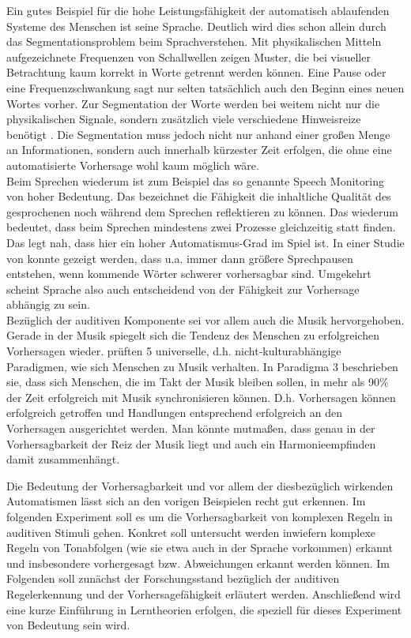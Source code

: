 \documentclass[doc,a4paper,12pt]{apa6}
\begin{document}
Ein gutes Beispiel für die hohe Leistungsfähigkeit der automatisch ablaufenden Systeme des Menschen ist seine Sprache. Deutlich wird dies schon allein durch das Segmentationsproblem beim Sprachverstehen. Mit physikalischen Mitteln aufgezeichnete Frequenzen von Schallwellen zeigen Muster, die bei visueller Betrachtung kaum korrekt in Worte getrennt werden können. Eine Pause oder eine Frequenzschwankung sagt nur selten tatsächlich auch den Beginn eines neuen Wortes vorher. Zur Segmentation der Worte werden bei weitem nicht nur die physikalischen Signale, sondern zusätzlich viele verschiedene Hinweisreize benötigt \parencites[u.a.][]{brent1996distributional}{saffran1996word}. Die Segmentation muss jedoch nicht nur anhand einer großen Menge an Informationen, sondern auch innerhalb kürzester Zeit erfolgen, die ohne eine automatisierte Vorhersage wohl kaum möglich wäre.\\
Beim Sprechen wiederum ist zum Beispiel das so genannte Speech Monitoring \parencites{levelt1983monitoring}{postma2000detection} von hoher Bedeutung. Das bezeichnet die Fähigkeit die inhaltliche Qualität des gesprochenen noch während dem Sprechen reflektieren zu können. Das wiederum bedeutet, dass beim Sprechen mindestens zwei Prozesse gleichzeitig statt finden. Das legt nah, dass hier ein hoher Automatismus-Grad im Spiel ist. In einer Studie von \textcite{goldman1958speech} konnte gezeigt werden, dass u.a. immer dann größere Sprechpausen entstehen, wenn kommende Wörter schwerer vorhersagbar sind. Umgekehrt scheint Sprache also auch entscheidend von der Fähigkeit zur Vorhersage abhängig zu sein.\\
Bezüglich der auditiven Komponente sei vor allem auch die Musik hervorgehoben. Gerade in der Musik spiegelt sich die Tendenz des Menschen zu erfolgreichen Vorhersagen wieder. \textcite{drake2001quest} prüften 5 universelle, d.h. nicht-kulturabhängige Paradigmen, wie sich Menschen zu Musik verhalten. In Paradigma 3 beschrieben sie, dass sich Menschen, die im Takt der Musik bleiben sollen, in mehr als 90\% der Zeit erfolgreich mit Musik synchronisieren können. D.h. Vorhersagen können erfolgreich getroffen und Handlungen entsprechend erfolgreich an den Vorhersagen ausgerichtet werden. Man könnte mutmaßen, dass genau in der Vorhersagbarkeit der Reiz der Musik liegt und auch ein Harmonieempfinden damit zusammenhängt.

Die Bedeutung der Vorhersagbarkeit und vor allem der diesbezüglich wirkenden Automatismen lässt sich an den vorigen Beispielen recht gut erkennen. Im folgenden Experiment soll es um die Vorhersagbarkeit von komplexen Regeln in auditiven Stimuli gehen. Konkret soll untersucht werden inwiefern komplexe Regeln von Tonabfolgen (wie sie etwa auch in der Sprache vorkommen) erkannt und insbesondere vorhergesagt bzw. Abweichungen erkannt werden können. Im Folgenden soll zunächst der Forschungsstand bezüglich der auditiven Regelerkennung und der Vorhersagefähigkeit erläutert werden. Anschließend wird eine kurze Einführung in Lerntheorien erfolgen, die speziell für dieses Experiment von Bedeutung sein wird.
\end{document}

